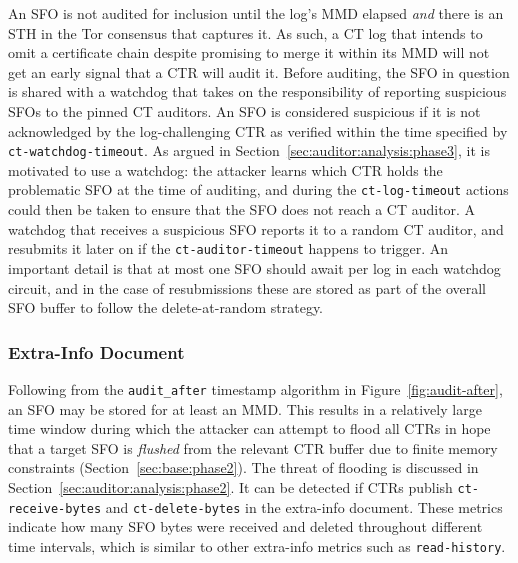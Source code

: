 An SFO is not audited for inclusion until the log's MMD elapsed \emph{and} there
is an STH in the Tor consensus that captures it.  As such, a CT log that intends
to omit a certificate chain despite promising to merge it within its MMD will
not get an early signal that a CTR will audit it.
Before auditing, the SFO in question is shared with a watchdog that takes on
the responsibility of reporting suspicious SFOs to the pinned CT auditors.
An SFO is considered suspicious if it is not acknowledged by the log-challenging
CTR as verified within the time specified by \texttt{ct-watchdog-timeout}.  As
argued in Section~\ref{sec:auditor:analysis:phase3}, it is motivated to use a
watchdog:
	the attacker learns which CTR holds the problematic SFO at the time of
		auditing, and
	during the \texttt{ct-log-timeout} actions could then be taken to ensure
		that the SFO does not reach a CT auditor.
A watchdog that receives a suspicious SFO reports it to a random CT auditor,
and resubmits it later on if the \texttt{ct-auditor-timeout} happens to
trigger.  An important detail is that at most one SFO should await per log in
each watchdog circuit, and in the case of resubmissions these are stored as part
of the overall SFO buffer to follow the delete-at-random strategy.

\subsubsection{Extra-Info Document} \label{sec:auditor:extra-info}
Following from the \texttt{audit\_after} timestamp algorithm in
Figure~\ref{fig:audit-after}, an SFO may be stored for at least an MMD.  This
results in a relatively large time window during which the attacker can attempt
to flood all CTRs in hope that a target SFO is \emph{flushed} from the relevant
CTR buffer due to finite memory constraints (Section~\ref{sec:base:phase2}).
The threat of flooding is discussed in
Section~\ref{sec:auditor:analysis:phase2}.  It can be detected if CTRs publish
	\texttt{ct-receive-bytes} and
	\texttt{ct-delete-bytes}
in the extra-info document.  These metrics indicate how many SFO bytes were
received and deleted throughout different time intervals, which is similar to
other extra-info metrics such as \texttt{read-history}.

